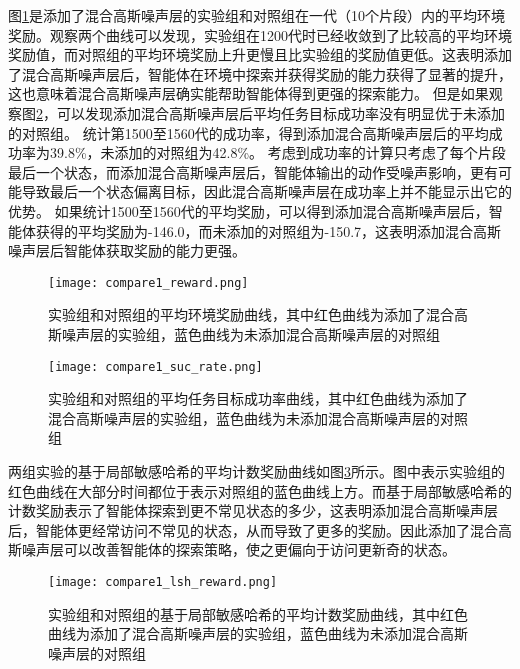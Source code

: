 图\ref{cmp1env_reward}是添加了混合高斯噪声层的实验组和对照组在一代（10个片段）内的平均环境奖励。观察两个曲线可以发现，实验组在1200代时已经收敛到了比较高的平均环境奖励值，而对照组的平均环境奖励上升更慢且比实验组的奖励值更低。这表明添加了混合高斯噪声层后，智能体在环境中探索并获得奖励的能力获得了显著的提升，这也意味着混合高斯噪声层确实能帮助智能体得到更强的探索能力。
但是如果观察图\ref{cmp1suc_rate}，可以发现添加混合高斯噪声层后平均任务目标成功率没有明显优于未添加的对照组。
统计第1500至1560代的成功率，得到添加混合高斯噪声层后的平均成功率为39.8\%，未添加的对照组为42.8\%。
考虑到成功率的计算只考虑了每个片段最后一个状态，而添加混合高斯噪声层后，智能体输出的动作受噪声影响，更有可能导致最后一个状态偏离目标，因此混合高斯噪声层在成功率上并不能显示出它的优势。
如果统计1500至1560代的平均奖励，可以得到添加混合高斯噪声层后，智能体获得的平均奖励为-146.0，而未添加的对照组为-150.7，这表明添加混合高斯噪声层后智能体获取奖励的能力更强。
        \begin{figure}[htpb]
        \centering
        \texttt{[image: compare1\_reward.png]}
        \caption{实验组和对照组的平均环境奖励曲线，其中红色曲线为添加了混合高斯噪声层的实验组，蓝色曲线为未添加混合高斯噪声层的对照组}
            \label{cmp1env_reward}
        \end{figure}

        \begin{figure}[htpb]
        \centering
        \texttt{[image: compare1\_suc\_rate.png]}
        \caption{实验组和对照组的平均任务目标成功率曲线，其中红色曲线为添加了混合高斯噪声层的实验组，蓝色曲线为未添加混合高斯噪声层的对照组}
            \label{cmp1suc_rate}
        \end{figure}

两组实验的基于局部敏感哈希的平均计数奖励曲线如图\ref{cmp1lsh_reward}所示。图中表示实验组的红色曲线在大部分时间都位于表示对照组的蓝色曲线上方。而基于局部敏感哈希的计数奖励表示了智能体探索到更不常见状态的多少，这表明添加混合高斯噪声层后，智能体更经常访问不常见的状态，从而导致了更多的奖励。因此添加了混合高斯噪声层可以改善智能体的探索策略，使之更偏向于访问更新奇的状态。
        \begin{figure}[htpb]
        \centering
        \texttt{[image: compare1\_lsh\_reward.png]}
        \caption{实验组和对照组的基于局部敏感哈希的平均计数奖励曲线，其中红色曲线为添加了混合高斯噪声层的实验组，蓝色曲线为未添加混合高斯噪声层的对照组}
            \label{cmp1lsh_reward}
        \end{figure}

